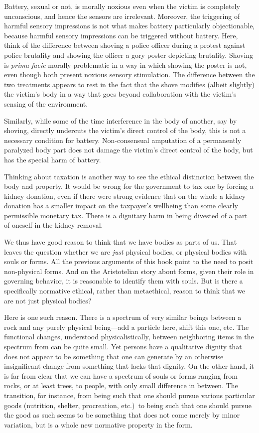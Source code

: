 Battery, sexual or not, is morally noxious even when the victim is completely unconscious, and 
hence the sensors are irrelevant. Moreover, the triggering of harmful sensory impressions
is not what makes battery particularly objectionable, because harmful sensory impressions can 
be triggered without battery. Here, think of the difference between shoving a police officer 
during a protest against police brutality and showing the officer a gory poster depicting 
brutality. Shoving is \textit{prima facie} morally problematic in a way in which showing 
the poster is not, even though both present noxious sensory stimulation. The difference between 
the two treatments appears to rest in the fact that the shove modifies (albeit slightly) the victim's body 
in a way that goes beyond collaboration with the victim's sensing of the environment.

Similarly, while some of the time interference in the body of another, say by shoving, directly 
undercuts the victim's direct control of the body, this is not a necessary condition for battery.
Non-consensual amputation of a permanently paralyzed body part does not damage the victim's direct
control of the body, but has the special harm of battery.

Thinking about taxation is another way to see the ethical distinction between the body and property.
It would be wrong for the government to tax one by forcing a kidney donation, even if there were strong
evidence that on the whole a kidney donation has a smaller impact on the taxpayer's wellbeing than some
clearly permissible monetary tax. There is a dignitary harm in being divested of a part of oneself in the 
kidney removal.

We thus have good reason to think that we have bodies as parts of us. That leaves the question whether
we are \textit{just} physical bodies, or physical bodies with souls or forms. All the previous arguments of this
book point to the need to posit non-physical forms. And on the Aristotelian story about forms, given their
role in governing behavior, it is reasonable to identify them with souls. But is there a specifically 
normative ethical, rather than metaethical, reason to think that we are not just physical bodies? 

Here is one such reason. There is a spectrum of very similar beings between a rock and any 
purely physical being---add a particle here, shift this one, etc. The functional changes, understood 
physicalistically, between neighboring items in the spectrum from can be quite small. Yet persons have 
a qualitative dignity that does not appear to be something that one can generate by an otherwise 
insignificant change from something that lacks that dignity. On the other hand, it is far from clear that 
we can have a spectrum of souls or forms ranging from rocks, or at least trees, to people, with only 
small difference in between. The transition, for instance, from being such that one should pursue various
particular goods (nutrition, shelter, procreation, etc.)\ to being such that one should pursue the good as 
such seems to be something that does not come merely by minor variation, but is a whole new normative property
in the form.


